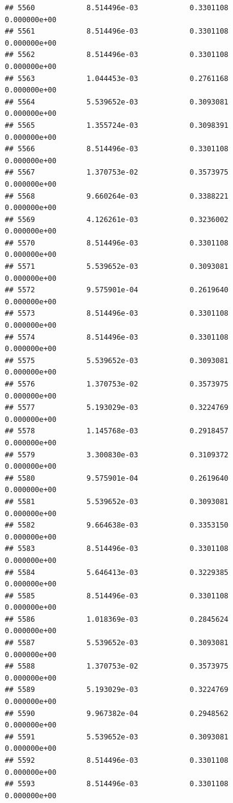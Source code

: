 \documentclass[
]{article}
\begin{document}
\begin{verbatim}
## 5560            8.514496e-03            0.3301108            0.000000e+00
## 5561            8.514496e-03            0.3301108            0.000000e+00
## 5562            8.514496e-03            0.3301108            0.000000e+00
## 5563            1.044453e-03            0.2761168            0.000000e+00
## 5564            5.539652e-03            0.3093081            0.000000e+00
## 5565            1.355724e-03            0.3098391            0.000000e+00
## 5566            8.514496e-03            0.3301108            0.000000e+00
## 5567            1.370753e-02            0.3573975            0.000000e+00
## 5568            9.660264e-03            0.3388221            0.000000e+00
## 5569            4.126261e-03            0.3236002            0.000000e+00
## 5570            8.514496e-03            0.3301108            0.000000e+00
## 5571            5.539652e-03            0.3093081            0.000000e+00
## 5572            9.575901e-04            0.2619640            0.000000e+00
## 5573            8.514496e-03            0.3301108            0.000000e+00
## 5574            8.514496e-03            0.3301108            0.000000e+00
## 5575            5.539652e-03            0.3093081            0.000000e+00
## 5576            1.370753e-02            0.3573975            0.000000e+00
## 5577            5.193029e-03            0.3224769            0.000000e+00
## 5578            1.145768e-03            0.2918457            0.000000e+00
## 5579            3.300830e-03            0.3109372            0.000000e+00
## 5580            9.575901e-04            0.2619640            0.000000e+00
## 5581            5.539652e-03            0.3093081            0.000000e+00
## 5582            9.664638e-03            0.3353150            0.000000e+00
## 5583            8.514496e-03            0.3301108            0.000000e+00
## 5584            5.646413e-03            0.3229385            0.000000e+00
## 5585            8.514496e-03            0.3301108            0.000000e+00
## 5586            1.018369e-03            0.2845624            0.000000e+00
## 5587            5.539652e-03            0.3093081            0.000000e+00
## 5588            1.370753e-02            0.3573975            0.000000e+00
## 5589            5.193029e-03            0.3224769            0.000000e+00
## 5590            9.967382e-04            0.2948562            0.000000e+00
## 5591            5.539652e-03            0.3093081            0.000000e+00
## 5592            8.514496e-03            0.3301108            0.000000e+00
## 5593            8.514496e-03            0.3301108            0.000000e+00

\end{verbatim}
\end{document}
